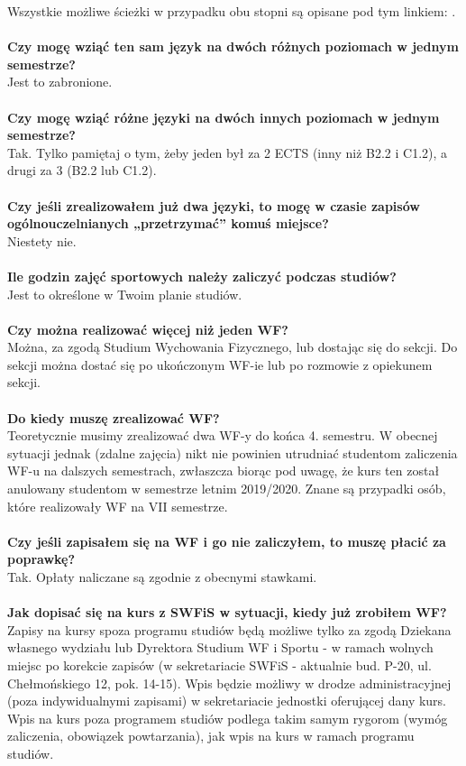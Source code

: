 \documentclass[11pt]{article}
\begin{document}
  Wszystkie możliwe ścieżki w przypadku obu stopni są opisane pod tym linkiem: 
   {}. \\\\
\textbf{Czy mogę wziąć ten sam język na dwóch różnych poziomach w jednym semestrze?}\\
\indent Jest to zabronione.\\\\
\textbf{Czy mogę wziąć różne języki na dwóch innych poziomach w jednym semestrze?}\\
\indent Tak. Tylko pamiętaj o tym, żeby jeden był za 2 ECTS (inny niż B2.2 i C1.2), a drugi za 3 (B2.2 lub C1.2).\\\\
\textbf{Czy jeśli zrealizowałem już dwa języki, to mogę w czasie zapisów ogólnouczelnianych „przetrzymać” komuś miejsce?}\\
\indent Niestety nie.\\\\
\textbf{Ile godzin zajęć sportowych należy zaliczyć podczas studiów?} \\
\indent Jest to określone w Twoim planie studiów. \\\\
\textbf{Czy można realizować więcej niż jeden WF?} \\
\indent Można, za zgodą Studium Wychowania Fizycznego, lub dostając się do sekcji. Do sekcji można dostać się po ukończonym WF-ie lub po rozmowie z opiekunem sekcji. \\\\
\textbf{Do kiedy muszę zrealizować WF?}\\
\indent Teoretycznie musimy zrealizować dwa WF-y do końca 4. semestru. W obecnej sytuacji jednak (zdalne zajęcia) nikt nie powinien utrudniać studentom zaliczenia WF-u na dalszych semestrach, zwłaszcza biorąc pod uwagę, że kurs ten został anulowany studentom w semestrze letnim 2019/2020. Znane są przypadki osób, które realizowały WF na VII semestrze.\\\\ 
\textbf{Czy jeśli zapisałem się na WF i go nie zaliczyłem, to muszę płacić za poprawkę?}\\
Tak. Opłaty naliczane są zgodnie z obecnymi stawkami. \\\\
\textbf{Jak dopisać się na kurs z SWFiS w sytuacji, kiedy już zrobiłem WF?} \\
\indent Zapisy na kursy spoza programu studiów będą możliwe tylko za zgodą Dziekana własnego wydziału lub Dyrektora Studium WF i Sportu - w ramach wolnych miejsc po korekcie zapisów (w sekretariacie SWFiS - aktualnie bud. P-20, ul. Chełmońskiego 12, pok. 14-15). Wpis będzie możliwy w drodze administracyjnej (poza indywidualnymi zapisami) w sekretariacie jednostki oferującej dany kurs. Wpis na kurs poza programem studiów podlega takim samym rygorom (wymóg zaliczenia, obowiązek powtarzania), jak wpis na kurs w ramach programu studiów. \\\\
\end{document}
